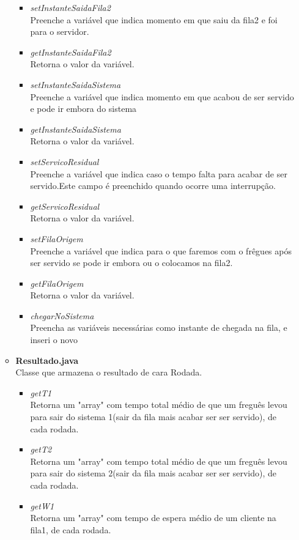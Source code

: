 \documentclass[a4paper,10pt]{article}
\begin{document}
\begin{itemize}
\begin{itemize}
\begin{itemize}
			 \item  \textit{setInstanteSaidaFila2\\}Preenche a variável que indica momento em que saiu da fila2 e foi para o servidor.
			 \item  \textit{getInstanteSaidaFila2\\}Retorna o valor da variável.
			 \item  \textit{setInstanteSaidaSistema\\}Preenche a variável que indica momento em que acabou de ser servido e pode ir embora do sistema
			 \item  \textit{getInstanteSaidaSistema\\}Retorna o valor da variável.
			 \item  \textit{setServicoResidual\\}Preenche a variável que indica caso o tempo falta para acabar de ser servido.Este campo é preenchido quando ocorre uma interrupção.
			 \item  \textit{getServicoResidual\\}Retorna o valor da variável.
			 \item  \textit{setFilaOrigem\\}Preenche a variável que indica para o que faremos com o frêgues após ser servido se pode ir embora ou o colocamos na fila2.
			 \item  \textit{getFilaOrigem\\}Retorna o valor da variável.
			 \item  \textit{chegarNoSistema\\}Preencha as variáveis necessárias como instante de chegada na fila, e inseri o novo 
		    \end{itemize}
	      \item \textbf{Resultado.java\\}
		    Classe que armazena o resultado de cara Rodada.
		    \begin{itemize}
			 \item  \textit{getT1\\}Retorna um "array" com tempo total médio de que um freguês levou para sair do sistema 1(sair da fila mais acabar ser ser servido), de cada rodada.  
			 \item  \textit{getT2\\}Retorna um "array" com tempo total médio de que um freguês levou para sair do sistema 2(sair da fila mais acabar ser ser servido), de cada rodada.  
			 \item  \textit{getW1\\}Retorna um "array" com tempo de espera médio de um cliente na fila1, de cada rodada.

\end{itemize}
\end{itemize}
\end{itemize}
\end{document}
